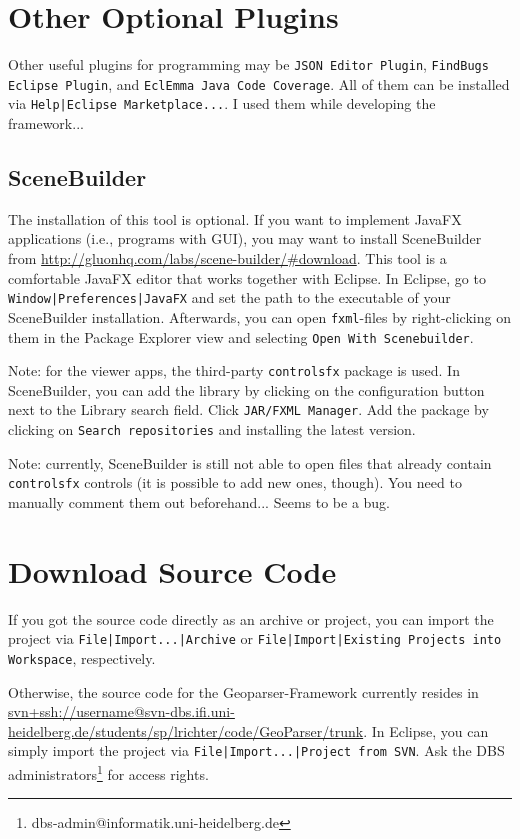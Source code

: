 \documentclass[fontsize=12pt, BCOR=10mm, DIV=14, parskip=true,headings=small]{scrartcl}
\begin{document}
\section{Other Optional Plugins}
Other useful plugins for programming may be \texttt{JSON Editor Plugin}, \texttt{FindBugs Eclipse Plugin}, and \texttt{EclEmma Java Code Coverage}. All of them can be installed via \texttt{Help\-|Eclipse Marketplace...}. I used them while developing the framework...

\subsection{SceneBuilder}
The installation of this tool is optional. If you want to implement JavaFX applications (i.e., programs with GUI), you may want to install SceneBuilder from \url{http://gluonhq.com/labs/scene-builder/#download}. This tool is a comfortable JavaFX editor that works together with Eclipse. In Eclipse, go to \texttt{Window|Preferences|JavaFX} and set the path to the executable of your SceneBuilder installation. Afterwards, you can open \texttt{fxml}-files by right-clicking on them in the Package Explorer view and selecting \texttt{Open With Scenebuilder}.

Note: for the viewer apps, the third-party \texttt{controlsfx} package is used. In SceneBuilder, you can add the library by clicking on the configuration button next to the Library search field. Click \texttt{JAR/FXML Manager}. Add the package by clicking on \texttt{Search repositories} and installing the latest version.

Note: currently, SceneBuilder is still not able to open files that already contain \texttt{controlsfx} controls (it is possible to add new ones, though). You need to manually comment them out beforehand... Seems to be a bug.

\section{Download Source Code}
If you got the source code directly as an archive or project, you can import the project via \texttt{File|Import...|Archive} or \texttt{File|Import|Existing Projects into Workspace}, respectively.

Otherwise, the source code for the Geoparser-Framework currently resides in \url{svn+ssh://username@svn-dbs.ifi.uni-heidelberg.de/students/sp/lrichter/code/GeoParser/trunk}. In Eclipse, you can simply import the project via \texttt{File|Import...|Project from SVN}. Ask the DBS administrators\footnote{dbs-admin@informatik.uni-heidelberg.de} for access rights.
\end{document}

